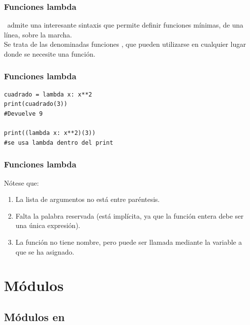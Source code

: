 \documentclass[12pt]{beamer}
\begin{document}
\begin{frame}
\frametitle{Funciones lambda}
\python\ admite una interesante sintaxis que permite definir funciones mínimas, de una línea, sobre la marcha. 
\\
\bigskip
\pause
Se trata de las denominadas funciones , que pueden utilizarse en cualquier lugar donde se necesite una función.
\end{frame}
\begin{frame}
\frametitle{Funciones lambda}
\begin{lstlisting}[caption=Ejemplo de función lambda,basicstyle=\linespread{1.2}\ttfamily\small, columns=fullflexible,escapeinside=||]
cuadrado = lambda x: x**2
print(cuadrado(3))
#Devuelve 9

print((lambda x: x**2)(3))
#se usa lambda dentro del print
\end{lstlisting}
\end{frame}
\begin{frame}
\frametitle{Funciones lambda}
Nótese que:
\begin{enumerate}[<+->]
\item La lista de argumentos no está entre paréntesis.
\item Falta la palabra reservada  (está implícita, ya que la función entera debe ser una única expresión). 
\item La función no tiene nombre, pero puede ser llamada mediante la variable a que se ha asignado.
\end{enumerate}
\end{frame}

\section{Módulos}
\subsection{Módulos en \python}
\end{document}
